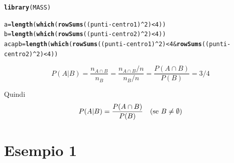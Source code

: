 \documentclass[onecolumn,12pt]{book}\usepackage[]{graphicx}\usepackage[]{color}
\makeatletter
\newcommand{\hlnum}[1]{\textcolor[rgb]{0.686,0.059,0.569}{#1}}%
\newcommand{\hlopt}[1]{\textcolor[rgb]{0,0,0}{#1}}%
\newcommand{\hlstd}[1]{\textcolor[rgb]{0.345,0.345,0.345}{#1}}%
\newcommand{\hlkwb}[1]{\textcolor[rgb]{0.69,0.353,0.396}{#1}}%
\newcommand{\hlkwd}[1]{\textcolor[rgb]{0.737,0.353,0.396}{\textbf{#1}}}%
\newenvironment{kframe}{%
 \def\at@end@of@kframe{}%
 \ifinner\ifhmode%
  \def\at@end@of@kframe{\end{minipage}}%
  \begin{minipage}{\columnwidth}%
 \fi\fi%
 \def\FrameCommand##1{\hskip\@totalleftmargin \hskip-\fboxsep
 \colorbox{shadecolor}{##1}\hskip-\fboxsep
     \hskip-\linewidth \hskip-\@totalleftmargin \hskip\columnwidth}%
 \MakeFramed {\advance\hsize-\width
   \@totalleftmargin\z@ \linewidth\hsize
   \@setminipage}}%
 {\par\unskip\endMakeFramed%
 \at@end@of@kframe}
\newenvironment{knitrout}{}{} %
\makeatother
\begin{document}
 
\begin{knitrout}
\color{fgcolor}\begin{kframe}
\begin{alltt}
\hlkwd{library}\hlstd{(MASS)}
\end{alltt}


{\ttfamily\noindent\itshape\color{messagecolor}{\#\# \\\#\# Attaching package: 'MASS'}}

{\ttfamily\noindent\itshape\color{messagecolor}{\#\# The following object is masked from 'package:EsamiR':\\\#\# \\\#\#\ \ \ \  crabs}}\begin{alltt}
\hlstd{a}\hlkwb{=}\hlkwd{length}\hlstd{(}\hlkwd{which}\hlstd{(}\hlkwd{rowSums}\hlstd{((punti}\hlopt{-}\hlstd{centro1)}\hlopt{^}\hlnum{2}\hlstd{)}\hlopt{<}\hlnum{4}\hlstd{))}
\hlstd{b}\hlkwb{=}\hlkwd{length}\hlstd{(}\hlkwd{which}\hlstd{(}\hlkwd{rowSums}\hlstd{((punti}\hlopt{-}\hlstd{centro2)}\hlopt{^}\hlnum{2}\hlstd{)}\hlopt{<}\hlnum{4}\hlstd{))}
\hlstd{acapb}\hlkwb{=}\hlkwd{length}\hlstd{(}\hlkwd{which}\hlstd{(}\hlkwd{rowSums}\hlstd{((punti}\hlopt{-}\hlstd{centro1)}\hlopt{^}\hlnum{2}\hlstd{)}\hlopt{<}\hlnum{4} \hlopt{&} \hlkwd{rowSums}\hlstd{((punti}\hlopt{-}\hlstd{centro2)}\hlopt{^}\hlnum{2}\hlstd{)}\hlopt{<}\hlnum{4}\hlstd{))}
\end{alltt}
\end{kframe}
\end{knitrout}

$$P(A| B)=\frac{n_{A\cap B}}{n_{B}}=\frac{n_{A\cap B}/n}{n_{B}/n}=\frac{P({A\cap B})}{P(B)}=3/4$$

Quindi 
$$P(A| B)=\frac{P({A\cap B})}{P(B)}\quad (\hbox{se } B\neq \emptyset)$$

\section{Esempio  1}
\end{document}
